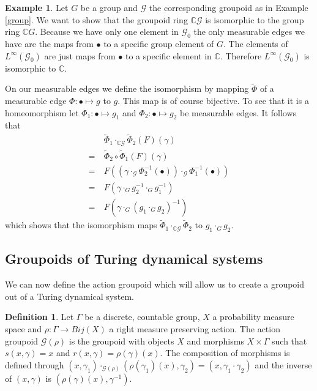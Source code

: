 \documentclass[12pt,a4paper]{scrartcl}
\theoremstyle{plain}
\theoremstyle{definition}
\newtheorem{Definition}[Theorem]{Definition}
\newtheorem{Example}[Theorem]{Example}
\numberwithin{equation}{section}
\newcommand{\C}{\mathbb{C}} %
\newcommand{\2}{\mathbb{Z} / 2 \mathbb{Z}}
\newcommand{\G}{\mathcal{G}}
\newcommand{\1}{\bar{1}}
\newcommand{\0}{\bar{0}}
\begin{document}
\begin{Example} \label{groupoid_ring_of_groups}
	Let $G$ be a group and $\G$ the corresponding groupoid as in Example \ref{group}. We want to show that the groupoid ring $\C \G$ is isomorphic to the group ring $\C G$. Because we have only one element in $\G_0$ the only measurable edges we have are the maps from $\bullet$ to a specific group element of $G$. The elements of $L^\infty(\G_0)$ are just maps from $\bullet$ to a specific element in $\C$. Therefore  $L^\infty(\G_0)$ is isomorphic to $\C$. 
	
	On our measurable edges we define the isomorphism by mapping $\tilde{\Phi}$ of a measurable edge $\Phi: \bullet \mapsto g$ to $g$. This map is of course bijective. To see that it is a homeomorphism let $\Phi_1: \bullet \mapsto g_1$ and $\Phi_2: \bullet \mapsto g_2$ be measurable edges. It follows that
	\begin{align*}
		  &~ \tilde{\Phi}_1 \cdot_{\C \G} \tilde{\Phi}_2(F)(\gamma) \\
		= &~ \tilde{\Phi}_2 \circ \tilde{\Phi}_1(F)(\gamma) \\
		= &~ F((\gamma \cdot_{\G} \Phi_2^{-1}(\bullet)) \cdot_{\G} \Phi_1^{-1}(\bullet)) \\
		= &~ F(\gamma \cdot_G g_2^{-1} \cdot_G g_1^{-1}) \\
		= &~ F(\gamma \cdot_G (g_1 \cdot_G g_2)^{-1})
	\end{align*}
	which shows that the isomorphism maps $	\tilde{\Phi}_1 \cdot_{\C \G} \tilde{\Phi}_2$ to $g_1 \cdot_G g_2$.
\end{Example}


\subsection{Groupoids of Turing dynamical systems}
We can now define the action groupoid which will allow us to create a groupoid out of a Turing dynamical system.
\begin{Definition} \label{action_groupoid}
	Let $\Gamma$ be a discrete, countable group, $X$ a probability measure space and $\rho: \Gamma \to Bij(X)$ a right measure preserving action. The action groupoid $\G(\rho)$ is the groupoid with objects $X$ and morphisms $X \times \Gamma$ such that $s(x,\gamma) = x$ and $r(x, \gamma) = \rho(\gamma) (x)$. The composition of morphisms is defined through $(x, \gamma_1) \cdot_{\G(\rho)} (\rho(\gamma_1) (x), \gamma_2) = (x, \gamma_1 \cdot \gamma_2)$ and the inverse of $(x, \gamma)$ is $(\rho(\gamma) (x), \gamma^{-1})$.
\end{Definition}
\end{document}
